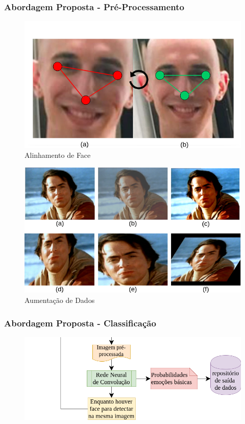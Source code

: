 \documentclass{beamer}
\begin{document}
\begin{frame}
\frametitle{Abordagem Proposta - Pré-Processamento}

\pause
\begin{figure}
\centering
\includegraphics[scale=0.23]{figuras/face_alinhada.png}
\caption{Alinhamento de Face}
\label{fig:face_alinhada}
\end{figure}

\pause 
\begin{figure}
\centering
\includegraphics[scale=0.23]{figuras/augmentation.png}
\caption{Aumentação de Dados}
\label{fig:augmentation}
\end{figure}


\end{frame}


\begin{frame}
\frametitle{Abordagem Proposta - Classificação}
\begin{figure}
\centering
\includegraphics[scale=0.33]{figuras/arquitetura_4.png}
\label{fig:arquitetura4}
\end{figure}
\end{frame}
\end{document}
